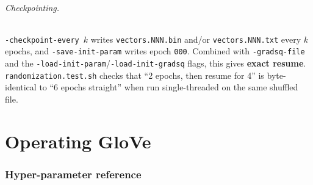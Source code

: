 \documentclass[11pt,a4paper]{article}
\newcommand{\file}[1]{\texttt{#1}}
\newcommand{\opt}[1]{\texttt{-#1}}
\begin{document}
\paragraph{Checkpointing.} \opt{checkpoint-every}~$k$ writes
\file{vectors.NNN.bin} and/or \file{vectors.NNN.txt} every $k$ epochs, and
\opt{save-init-param} writes epoch \texttt{000}. Combined with \opt{gradsq-file} and the
\opt{load-init-param}/\opt{load-init-gradsq} flags, this gives \textbf{exact resume}.
\file{randomization.test.sh} checks that ``2 epochs, then resume for 4'' is byte-identical
to ``6 epochs straight'' when run single-threaded on the same shuffled file.

\part{Operating GloVe}

\section{Hyper-parameter reference}
\end{document}
